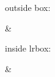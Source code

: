 \documentclass{article}
\begin{document}
outside box:
\begin{tenkz}[physical=up]
   & 
\end{tenkz}

inside lrbox:
\begin{lrbox}{\probebox}
\begin{tenkz}[physical=up]
   & 
\end{tenkz}
\end{lrbox}
\usebox{\probebox}
\end{document}
